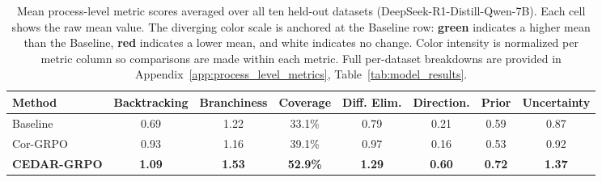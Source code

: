 \documentclass[11pt]{article}
\begin{document}
\begin{table}[tbp]
  \centering
  \small
  \setlength{\tabcolsep}{3pt} %
  \renewcommand{\arraystretch}{1.2}
  \begin{tabular}{l !{\hskip 4pt} c !{\hskip 4pt} c !{\hskip 4pt} c !{\hskip 4pt} c !{\hskip 4pt} c !{\hskip 4pt} c !{\hskip 4pt} c}
    \toprule
    \textbf{Method} & \textbf{Backtracking} & \textbf{Branchiness} & \textbf{Coverage} & \textbf{Diff. Elim.} & \textbf{Direction.} & \textbf{Prior} & \textbf{Uncertainty} \\
    \midrule
    Baseline & 0.69 & 1.22 & 33.1\% & 0.79 & 0.21 & 0.59 & 0.87 \\
    \addlinespace
    Cor-GRPO & 0.93 & 1.16 & 39.1\% & 0.97 & 0.16 & 0.53 & 0.92 \\
    \addlinespace
    \textbf{CEDAR-GRPO} & \textbf{1.09} & \textbf{1.53} & \textbf{52.9\%} & \textbf{1.29} & \textbf{0.60} & \textbf{0.72} & \textbf{1.37} \\
    \bottomrule
  \end{tabular}
  \caption{Mean process-level metric scores averaged over all ten held-out datasets
     (DeepSeek-R1-Distill-Qwen-7B). Each cell shows the raw mean value. The diverging
     color scale is anchored at the Baseline row: \textcolor[HTML]{27ae60}{\textbf{green}}
     indicates a higher mean than the Baseline, \textcolor[HTML]{c0392b}{\textbf{red}}
     indicates a lower mean, and white indicates no change. Color intensity is
     normalized per metric column so comparisons are made within each metric. 
     Full per-dataset breakdowns are provided in Appendix~\ref{app:process_level_metrics}, Table~\ref{tab:model_results}.}
  \label{tab:mean_heatmap_table}
\end{table}


\end{document}
